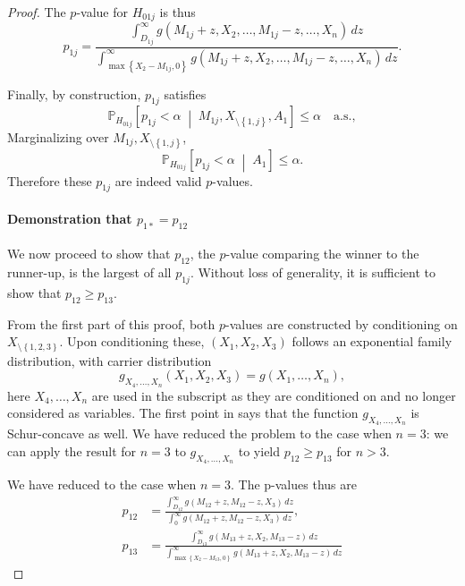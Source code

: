 \documentclass[aos, authoryear]{imsart}
\theoremstyle{definition}
\theoremstyle{custom}
\newcommand{\PP}{\mathbb{P}}
\begin{document}
\begin{proof}
The $p$-value for $H_{01j}$ is thus
\begin{equation}
\label{eq:p1j}
p_{1j} = \frac{\int_{D_{1j}}^\infty g\left(M_{1j} + z, X_2, \ldots, M_{1j} - z, \ldots, X_n\right) \,dz}{\int_{\max\left\{X_2 - M_{1j}, 0\right\}}^\infty g\left(M_{1j} + z, X_2, \ldots, M_{1j} - z, \ldots, X_n\right) \,dz}.
\end{equation}

Finally, by construction, $p_{1j}$ satisfies
\[\PP_{H_{01j}}\left[p_{1j} < \alpha \;\middle|\; M_{1j}, X_{\setminus\left\{1, j\right\}}, A_1\right] \le \alpha \quad \text{a.s.},\]
Marginalizing over $M_{1j}, X_{\setminus\left\{1, j\right\}}$,
\[\PP_{H_{01j}}\left[p_{1j} < \alpha \;\middle|\; A_1\right] \le \alpha.\]
Therefore these $p_{1j}$ are indeed valid $p$-values.

\paragraph{Demonstration that $p_{1*}=p_{12}$}

We now proceed to show that $p_{12}$, the $p$-value comparing the winner to the runner-up, is the largest of all $p_{1j}$. Without loss of generality, it is sufficient to show that $p_{12} \ge p_{13}$.

From the first part of this proof, both $p$-values are constructed by conditioning on $X_{\setminus\left\{1, 2, 3\right\}}$. Upon conditioning these, $\left(X_1, X_2, X_3\right)$ follows an exponential family distribution, with carrier distribution
\[g_{X_4, \ldots, X_n}\left(X_1, X_2, X_3\right) = g\left(X_1, \ldots, X_n\right),\]
here $X_4, \ldots, X_n$ are used in the subscript as they are conditioned on and no longer considered as variables. The first point in  says that the function $g_{X_4, \ldots, X_n}$ is Schur-concave as well. We have reduced the problem to the case when $n = 3$: we can apply the result for $n = 3$ to $g_{X_4, \ldots, X_n}$ to yield $p_{12} \ge p_{13}$ for $n > 3$.

We have reduced to the case when $n = 3$. The p-values thus are
\begin{align*}
p_{12} & = \frac{\int_{D_{12}}^\infty g\left(M_{12} + z, M_{12} - z, X_3\right) \,dz}{\int_0^\infty g\left(M_{12} + z, M_{12} - z, X_3\right) \,dz}, \\
p_{13} & = \frac{\int_{D_{13}}^\infty g\left(M_{13} + z, X_2, M_{13} - z\right) \,dz}{\int_{\max\left\{X_2 - M_{13}, 0\right\}}^\infty g\left(M_{13} + z, X_2, M_{13} - z\right) \,dz}
\end{align*}


\end{proof}
\end{document}
